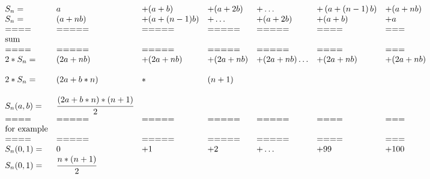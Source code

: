 \documentclass[12pt]{article}
\begin{document}
\[
\begin{array}{lllllll}S_n =& a &+ (a + b) &+ (a + 2b) &+ \ldots  &+ \left(a+ \left(n-1\right) b\right) &+ (a+nb) 
\\
S_n =& (a+nb) &+ (a + (n-1)b) &+ \ldots &+ (a + 2b ) &+ (a + b) &+ a 
\\
====& ===== & ===== & ===== &=====&====&=== 
\\
\text{sum}
\\
====& ===== & ===== & ===== &=====&====&=== 
\\
2*S_n =& (2a+nb) &+ (2a+nb) &+ (2a+nb) &+ (2a+nb) \ldots &+ (2a+nb) &+ (2a+nb) 
\\
 
\\
2*S_n =& (2a+b*n) &*& (n + 1 )
\\
\\
S_n(a,b) =& \cfrac {(2a+b*n) * (n + 1) } {2}
\\
====& ===== & ===== & ===== &=====&====&=== 
\\
\text{for example}
\\
====& ===== & ===== & ===== &=====&====&=== 
\\
S_n(0,1) =& 0 &+ 1 &+ 2 &+ \ldots  &+ 99 &+ 100
\\
S_n(0,1) =& \cfrac {n * (n + 1)}{2}

 \end{array}
\]
\end{document}
